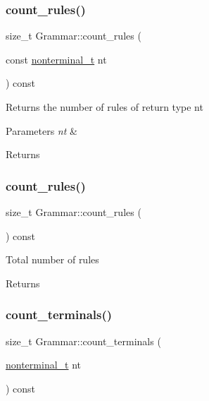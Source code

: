 \subsubsection{\texorpdfstring{count\+\_\+rules()}{count\_rules()}\hspace{0.1cm}{\footnotesize\ttfamily [1/2]}}
{\footnotesize\ttfamily size\+\_\+t Grammar\+::count\+\_\+rules (\begin{DoxyParamCaption}\item[{const \hyperlink{_nonterminal_8h_a5c1f658dc7560600a16d22408bd716ca}{nonterminal\+\_\+t}}]{nt }\end{DoxyParamCaption}) const\hspace{0.3cm}{\ttfamily [inline]}}

Returns the number of rules of return type nt 
\begin{DoxyParams}{Parameters}
{\em nt} & \\
\hline
\end{DoxyParams}
\begin{DoxyReturn}{Returns}

\end{DoxyReturn}
\mbox{\label{class_grammar_af8f0fdd9cb368a608bee5626774360d4}} 
\subsubsection{\texorpdfstring{count\+\_\+rules()}{count\_rules()}\hspace{0.1cm}{\footnotesize\ttfamily [2/2]}}
{\footnotesize\ttfamily size\+\_\+t Grammar\+::count\+\_\+rules (\begin{DoxyParamCaption}{ }\end{DoxyParamCaption}) const\hspace{0.3cm}{\ttfamily [inline]}}

Total number of rules \begin{DoxyReturn}{Returns}

\end{DoxyReturn}
\mbox{\label{class_grammar_a7cf0515f3ca761590da05455a417896b}} 
\subsubsection{\texorpdfstring{count\+\_\+terminals()}{count\_terminals()}}
{\footnotesize\ttfamily size\+\_\+t Grammar\+::count\+\_\+terminals (\begin{DoxyParamCaption}\item[{\hyperlink{_nonterminal_8h_a5c1f658dc7560600a16d22408bd716ca}{nonterminal\+\_\+t}}]{nt }\end{DoxyParamCaption}) const\hspace{0.3cm}{\ttfamily [inline]}}

